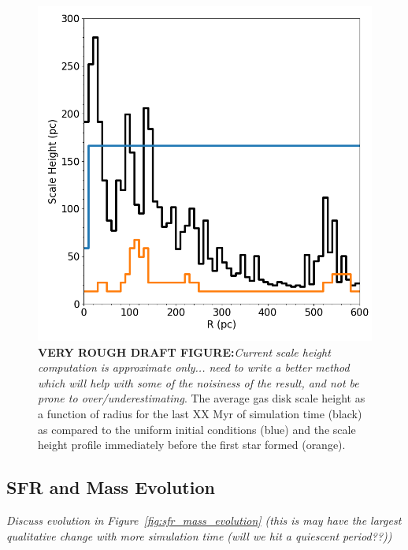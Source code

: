 \documentclass[twocolumn]{aastex61}
\begin{document}
\begin{figure}
\centering
\includegraphics[width=0.975\linewidth]{scale_height}
\caption{\textbf{VERY ROUGH DRAFT FIGURE:}\textit{Current scale height computation is approximate only... need to write a better method which will help with some of the noisiness of the result, and not be prone to over/underestimating}. The average gas disk scale height as a function of radius for the last XX Myr of simulation time (black) as compared to the uniform initial conditions (blue) and the scale height profile immediately before the first star formed (orange).}
\label{fig:scale_height}
\end{figure}

\subsection{SFR and Mass Evolution}
\label{sec:sfr}

\textit{Discuss evolution in Figure~\ref{fig:sfr_mass_evolution} (this is may have the largest qualitative change with more simulation time (will we hit a quiescent period??))}
\end{document}
